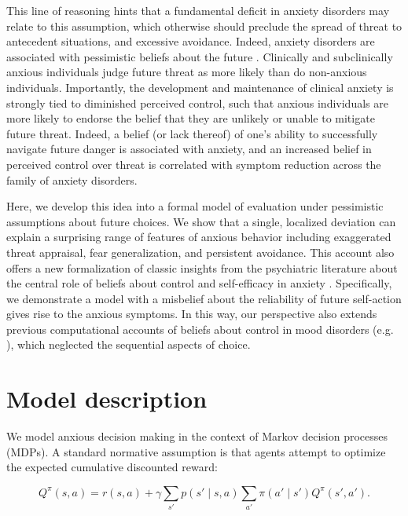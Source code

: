 \documentclass[11pt]{article} %
\begin{document}
This line of reasoning hints that a fundamental deficit in anxiety disorders may relate to this assumption, which otherwise should preclude the spread of threat to antecedent situations, and excessive avoidance. Indeed, anxiety disorders are associated with pessimistic beliefs about the future \citep{ClarkBeck2011}. Clinically and subclinically anxious individuals judge future threat as more likely than do non-anxious individuals\citep{ButlerMathews1983, ButlerMathews1987, MacleodByrne1996}. Importantly, the development and maintenance of clinical anxiety is strongly tied to diminished perceived control\citep{bandura1977, barlow2002, gallagher2014a}, such that anxious individuals are more likely to endorse the belief that they are unlikely or unable to mitigate future threat. Indeed, a belief (or lack thereof) of one's ability to successfully navigate future danger is associated with anxiety\citep{davey1996, dugas1997}, and an increased belief in perceived control over threat is correlated with symptom reduction across the family of anxiety disorders\citep{gallagher2014b}. 

Here, we develop this idea into a formal model of evaluation under pessimistic assumptions about future choices. We show that a single, localized deviation can explain a surprising range of features of anxious behavior including exaggerated threat appraisal, fear generalization, and persistent avoidance. This account also offers a new formalization of classic insights from the psychiatric literature about the central role of beliefs about control and self-efficacy in anxiety \citep{bandura1977, barlow2002}. Specifically, we demonstrate a model with a misbelief about the reliability of future self-action gives rise to the anxious symptoms. In this way, our perspective also extends previous computational accounts of beliefs about control in mood disorders (e.g. \cite{HuysDayan2009}), which neglected the sequential aspects of choice.

\section{Model description}

We model anxious decision making in the context of Markov decision processes (MDPs). A standard normative assumption is that agents attempt to optimize the expected cumulative discounted reward:

\begin{equation*}
Q^\pi(s,a) = r(s,a) + \gamma \sum_{s'} p(s' \mid s,a) \sum_{a'} \pi(a' \mid s') Q^\pi(s',a').
\end{equation*}
\end{document}
